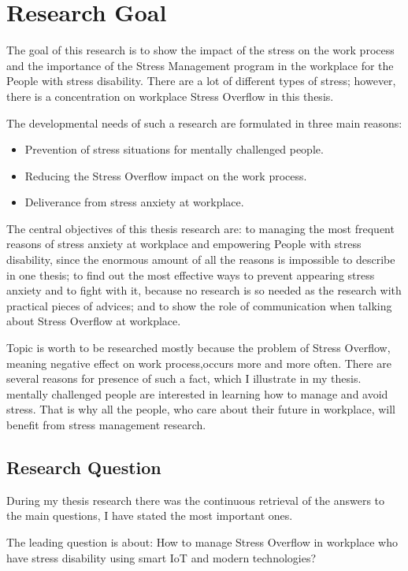 \section{Research Goal}
The goal of this research is to show the impact of the stress on the work process and the importance of the Stress Management program in the workplace for the People with stress disability. There are a lot of different types of stress; however, there is a concentration on workplace Stress Overflow in this thesis.

The developmental needs of such a research are formulated in three main reasons:
\begin{itemize}
    \item Prevention of stress situations for mentally challenged people.
    \item Reducing the Stress Overflow impact on the work process.
    \item Deliverance from stress anxiety at workplace.
\end{itemize}
The central objectives of this thesis research are: to managing the most frequent reasons of stress anxiety at workplace and empowering People with stress disability, since the enormous amount of all the reasons is impossible to describe in one thesis; to find out the most effective ways to prevent appearing stress anxiety and to fight with it, because no research is so needed as the research with practical pieces of advices; and to show the role of communication when talking about Stress Overflow at workplace.

Topic is worth to be researched mostly because the problem of Stress Overflow, meaning negative effect on work process,occurs more and more often. There are several reasons for presence of such a fact, which I illustrate in my thesis. mentally challenged people are interested in learning how to manage and avoid stress. That is why all the people, who care about their future in workplace, will benefit from stress management research. 

\subsection{Research Question}
During my thesis research there was the continuous retrieval of the answers to the main questions, I have stated the most important ones.

The leading question is about: How to manage Stress Overflow in workplace who have stress disability using smart \ac{IoT} and modern technologies?


